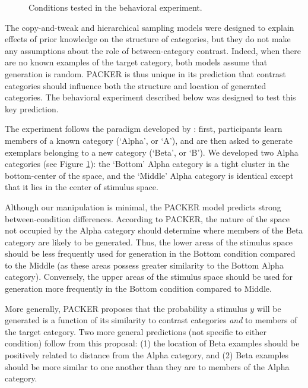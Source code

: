 \documentclass[10pt,letterpaper]{article}
\begin{document}
\begin{figure}
    \begin{center}
    
    \caption{Conditions tested in the behavioral experiment.}
    \label{fig:middle-bottom-conditions}
    \end{center}
\end{figure}


The copy-and-tweak and hierarchical sampling models were designed to explain effects of prior knowledge on the structure of categories, but they do not make any assumptions about the role of between-category contrast. Indeed, when there are no known examples of the target category, both models assume that generation is random. PACKER is thus unique in its prediction that contrast categories should influence both the structure and location of generated categories. The behavioral experiment described below was designed to test this key prediction. 

The experiment follows the paradigm developed by \citet{jern2013probabilistic}: first, participants learn members of a known category (`Alpha', or `A'), and are then asked to generate exemplars belonging to a new category (`Beta', or `B'). We developed two Alpha categories (see Figure \ref{fig:middle-bottom-conditions}): the `Bottom' Alpha category is a tight cluster in the bottom-center of the space, and the `Middle' Alpha category is identical except that it lies in the center of stimulus space.

Although our manipulation is minimal, the PACKER model predicts strong between-condition differences. According to PACKER, the nature of the space not occupied by the Alpha category should determine where members of the Beta category are likely to be generated. Thus, the lower areas of the stimulus space should be less frequently used for generation in the Bottom condition compared to the Middle (as these areas possess greater similarity to the Bottom Alpha category). Conversely, the upper areas of the stimulus space should be used for generation more frequently in the Bottom condition compared to Middle.


More generally, PACKER proposes that the probability a stimulus $y$ will be generated is a function of its similarity to contrast categories \textit{and} to members of the target category. Two more general predictions (not specific to either condition) follow from this proposal: (1) the location of Beta examples should be positively related to distance from the Alpha category, and (2) Beta examples should be more similar to one another than they are to members of the Alpha category.
\end{document}
